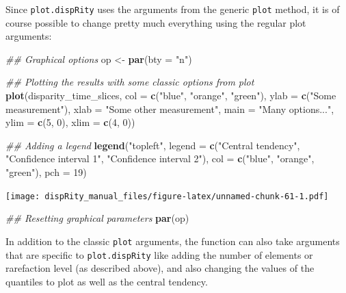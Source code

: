 \documentclass[]{book}
\newenvironment{Shaded}{\begin{snugshade}}{\end{snugshade}}
\newcommand{\CommentTok}[1]{\textcolor[rgb]{0.56,0.35,0.01}{\textit{#1}}}
\newcommand{\DataTypeTok}[1]{\textcolor[rgb]{0.13,0.29,0.53}{#1}}
\newcommand{\DecValTok}[1]{\textcolor[rgb]{0.00,0.00,0.81}{#1}}
\newcommand{\KeywordTok}[1]{\textcolor[rgb]{0.13,0.29,0.53}{\textbf{#1}}}
\newcommand{\NormalTok}[1]{#1}
\newcommand{\StringTok}[1]{\textcolor[rgb]{0.31,0.60,0.02}{#1}}
\begin{document}
Since \texttt{plot.dispRity} uses the arguments from the generic \texttt{plot} method, it is of course possible to change pretty much everything using the regular plot arguments:

\begin{Shaded}
\begin{Highlighting}[]
\CommentTok{## Graphical options}
\NormalTok{op <-}\StringTok{ }\KeywordTok{par}\NormalTok{(}\DataTypeTok{bty =} \StringTok{"n"}\NormalTok{)}

\CommentTok{## Plotting the results with some classic options from plot}
\KeywordTok{plot}\NormalTok{(disparity_time_slices, }\DataTypeTok{col =} \KeywordTok{c}\NormalTok{(}\StringTok{"blue"}\NormalTok{, }\StringTok{"orange"}\NormalTok{, }\StringTok{"green"}\NormalTok{),}
    \DataTypeTok{ylab =} \KeywordTok{c}\NormalTok{(}\StringTok{"Some measurement"}\NormalTok{), }\DataTypeTok{xlab =} \StringTok{"Some other measurement"}\NormalTok{,}
    \DataTypeTok{main =} \StringTok{"Many options..."}\NormalTok{, }\DataTypeTok{ylim =} \KeywordTok{c}\NormalTok{(}\DecValTok{5}\NormalTok{, }\DecValTok{0}\NormalTok{), }\DataTypeTok{xlim =} \KeywordTok{c}\NormalTok{(}\DecValTok{4}\NormalTok{, }\DecValTok{0}\NormalTok{))}

\CommentTok{## Adding a legend}
\KeywordTok{legend}\NormalTok{(}\StringTok{"topleft"}\NormalTok{, }\DataTypeTok{legend =} \KeywordTok{c}\NormalTok{(}\StringTok{"Central tendency"}\NormalTok{,}
                             \StringTok{"Confidence interval 1"}\NormalTok{,}
                             \StringTok{"Confidence interval 2"}\NormalTok{),}
      \DataTypeTok{col =} \KeywordTok{c}\NormalTok{(}\StringTok{"blue"}\NormalTok{, }\StringTok{"orange"}\NormalTok{, }\StringTok{"green"}\NormalTok{), }\DataTypeTok{pch =} \DecValTok{19}\NormalTok{)}
\end{Highlighting}
\end{Shaded}

\texttt{[image: dispRity\_manual\_files/figure-latex/unnamed-chunk-61-1.pdf]}

\begin{Shaded}
\begin{Highlighting}[]
\CommentTok{## Resetting graphical parameters}
\KeywordTok{par}\NormalTok{(op)}
\end{Highlighting}
\end{Shaded}

In addition to the classic \texttt{plot} arguments, the function can also take arguments that are specific to \texttt{plot.dispRity} like adding the number of elements or rarefaction level (as described above), and also changing the values of the quantiles to plot as well as the central tendency.
\end{document}
